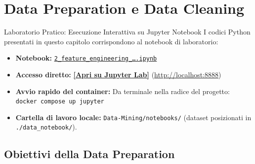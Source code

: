 \chapter{Data Preparation e Data Cleaning}
\label{ch:data-preparation}

\begin{noteblock}{Laboratorio Pratico: Esecuzione Interattiva su Jupyter Notebook}
I codici Python presentati in questo capitolo corrispondono al notebook di laboratorio:
\begin{itemize}
    \item \textbf{Notebook:} \href{http://localhost:8888/lab/tree/notebooks/2_feature_engineering_and_data_representation.ipynb}{\texttt{2\_feature\_engineering\_\dots.ipynb}}
    \item \textbf{Accesso diretto:} \href{http://localhost:8888/lab/tree/notebooks/2_feature_engineering_and_data_representation.ipynb}{\textbf{[Apri su Jupyter Lab]}} \quad (\url{http://localhost:8888})
    \item \textbf{Avvio rapido del container:} Da terminale nella radice del progetto: \texttt{docker compose up jupyter}
    \item \textbf{Cartella di lavoro locale:} \texttt{Data-Mining/notebooks/} (dataset posizionati in \texttt{./data\_notebook/}).
\end{itemize}
\end{noteblock}

\FloatBarrier
\section{Obiettivi della Data Preparation}

